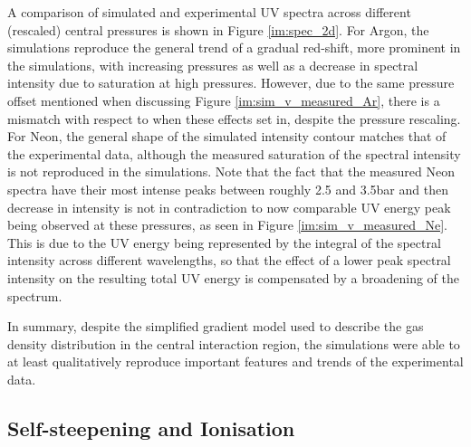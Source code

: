 \documentclass[a4paper]{jpconf}
\begin{document}
A comparison of simulated and experimental UV spectra across different (rescaled) central pressures is shown in Figure \ref{im:spec_2d}. For Argon, the simulations reproduce the general trend of a gradual red-shift, more prominent in the simulations, with increasing pressures as well as a decrease in spectral intensity due to saturation at high pressures. However, due to the same pressure offset mentioned when discussing Figure \ref{im:sim_v_measured_Ar}, there is a mismatch with respect to when these effects set in, despite the pressure rescaling. For Neon, the general shape of the simulated intensity contour matches that of the experimental data, although the measured saturation of the spectral intensity is not reproduced in the simulations. Note that the fact that the measured Neon spectra have their most intense peaks between roughly 2.5 and 3.5bar and then decrease in intensity is not in contradiction to now comparable UV energy peak being observed at these pressures, as seen in Figure \ref{im:sim_v_measured_Ne}. This is due to the UV energy being represented by the integral of the spectral intensity across different wavelengths, so that the effect of a lower peak spectral intensity on the resulting total UV energy is compensated by a broadening of the spectrum.  \par 
In summary, despite the simplified gradient model used to describe the gas density distribution in the central interaction region, the simulations were able to at least qualitatively reproduce important features and trends of the experimental data. 

\subsection{Self-steepening and Ionisation}
\end{document}
